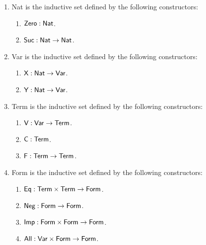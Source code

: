 \documentclass[11pt,fleqn]{article}
\newcommand{\mname}[1]{\mbox{\sf #1}}
\begin{document}
\begin{enumerate}

  \item \mname{Nat} is the inductive set defined by the following
    constructors:

  \begin{enumerate}

    \item $\mname{Zero} : \mname{Nat}$.

    \item $\mname{Suc} : \mname{Nat} \rightarrow \mname{Nat}$.

  \end{enumerate}

  \item \mname{Var} is the inductive set defined by the following
    constructors:

  \begin{enumerate}

    \item $\mname{X} : \mname{Nat} \rightarrow \mname{Var}$.

    \item $\mname{Y} : \mname{Nat} \rightarrow \mname{Var}$.

  \end{enumerate}

  \item \mname{Term} is the inductive set defined by the following
    constructors:

  \begin{enumerate}

    \item $\mname{V} : \mname{Var} \rightarrow \mname{Term}$.

    \item $\mname{C} : \mname{Term}$.

    \item $\mname{F} : \mname{Term} \rightarrow \mname{Term}$.

  \end{enumerate}

  \item \mname{Form} is the inductive set defined by the following
    constructors:

  \begin{enumerate}

    \item $\mname{Eq} : \mname{Term} \times \mname{Term} \rightarrow \mname{Form}$.

    \item $\mname{Neg} : \mname{Form} \rightarrow \mname{Form}$.

    \item $\mname{Imp} : \mname{Form} \times \mname{Form} \rightarrow \mname{Form}$.

    \item $\mname{All} : \mname{Var} \times \mname{Form} \rightarrow \mname{Form}$.

  \end{enumerate}

\end{enumerate}
\end{document}
